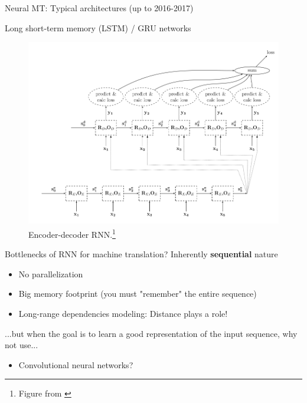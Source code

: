 \documentclass[12pt,aspectratio=169,handout]{beamer}
\begin{document}
\begin{frame}{Neural MT: Typical architectures (up to 2016-2017)}
	
	Long short-term memory (LSTM) / GRU networks
	
	
	\begin{figure}
		\includegraphics[width=0.65\linewidth]{img/end-dec.png}
		\caption{Encoder-decoder RNN.\footnote{Figure from \citep{Goldberg.2016}}}
	\end{figure}
\end{frame}


\begin{frame}{Bottlenecks of RNN for machine translation?}
	Inherently \textbf{sequential} nature
	
	\begin{itemize}
		\item No parallelization
		\item Big memory footprint (you must "remember" the entire sequence)
		\item Long-range dependencies modeling: Distance plays a role!
	\end{itemize}
	
	...but when the goal is to learn a good representation of the input sequence, why not use...
	
	\begin{itemize}
		\item Convolutional neural networks?
	\end{itemize}
	
\end{frame}
\end{document}
